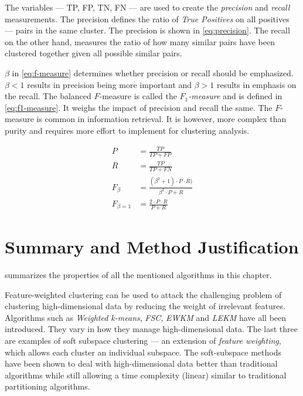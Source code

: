 \documentclass[../report.tex]{subfiles}
\begin{document}
The variables --- TP, FP, TN, FN --- are used to create the \textit{precision} and \textit{recall} measurements. The precision defines the ratio of \textit{True Positives} on all positives --- pairs in the same cluster. The precision is shown in \cref{eq:precision}. The recall on the other hand, measures the ratio of how many similar pairs have been clustered together given all possible similar pairs. 

$\beta$ in \cref{eq:f-measure} determines whether precision or recall should be emphasized. $\beta < 1$ results in precision being more important and $\beta > 1$ results in emphasis on the recall. The balanced $F$-measure is called the \textit{$F_1$-measure} and is defined in \cref{eq:f1-measure}. It weighs the impact of precision and recall the same. The $F$-measure is common in information retrieval. It is however, more complex than purity and requires more effort to implement for clustering analysis.

\begin{align}
  \label{eq:precision}
  P &= \frac{TP}{TP+FP} \\
  \label{eq:recall}
  R &= \frac{TP}{TP+FN} \\
  \label{eq:f-measure}
  F_\beta &= \frac{(\beta^2 + 1) \cdot P \cdot R)}{\beta^2 \cdot P + R} \\
  \label{eq:f1-measure}
  F_{\beta = 1} &= \frac{2 \cdot P \cdot R}{P + R}
\end{align}

\section{Summary and Method Justification}
 summarizes the properties of all the mentioned algorithms in this chapter.

Feature-weighted clustering can be used to attack the challenging problem of clustering high-dimensional data by reducing the weight of irrelevant features. Algorithms such as \textit{Weighted k-means}, \textit{FSC}, \textit{EWKM} and \textit{LEKM} have all been introduced.  They vary in how they manage high-dimensional data. The last three are examples of soft subspace clustering --- an extension of \textit{feature weighting}, which allows each cluster an individual subspace. The soft-subspace methods have been shown to deal with high-dimensional data better than traditional algorithms while still allowing a time complexity (linear) similar to traditional partitioning algorithms.
\end{document}
